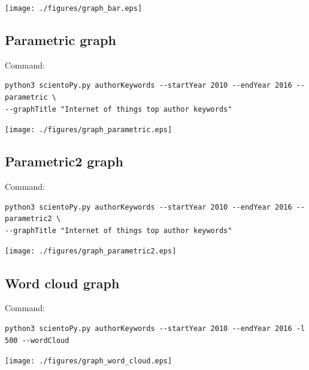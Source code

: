 \documentclass[10pt,letterpaper]{article}
\begin{document}
\begin{center}
	\texttt{[image: ./figures/graph\_bar.eps]}
\end{center}

\newpage
\subsection{Parametric graph}
Command: 
\begin{verbatim}
python3 scientoPy.py authorKeywords --startYear 2010 --endYear 2016 --parametric \
--graphTitle "Internet of things top author keywords"
\end{verbatim}

\begin{center}
	\texttt{[image: ./figures/graph\_parametric.eps]}
\end{center}

\subsection{Parametric2 graph}
Command: 
\begin{verbatim}
python3 scientoPy.py authorKeywords --startYear 2010 --endYear 2016 --parametric2 \
--graphTitle "Internet of things top author keywords"
\end{verbatim}

\begin{center}
	\texttt{[image: ./figures/graph\_parametric2.eps]}
\end{center}


\subsection{Word cloud graph}
Command: 
\begin{verbatim}
python3 scientoPy.py authorKeywords --startYear 2010 --endYear 2016 -l 500 --wordCloud
\end{verbatim}

\begin{center}
	\texttt{[image: ./figures/graph\_word\_cloud.eps]}
\end{center}
\end{document}
